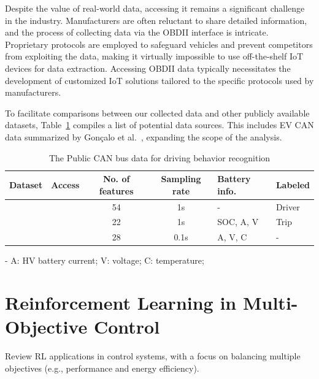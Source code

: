Despite the value of real-world data, accessing it remains a significant challenge in the industry. 
Manufacturers are often reluctant to share detailed information, and the process of collecting data via the \gls{OBDII} interface is intricate. 
Proprietary protocols are employed to safeguard vehicles and prevent competitors from exploiting the data, making it virtually impossible to use off-the-shelf \gls{IoT} devices for data extraction. 
Accessing \gls{OBDII} data typically necessitates the development of customized \gls{IoT} solutions tailored to the specific protocols used by manufacturers.

To facilitate comparisons between our collected data and other publicly available datasets, Table~\ref{tab:public_data} compiles a list of potential data sources. 
This includes \gls{EV} \gls{CAN} data summarized by Gonçalo et al.~\cite{dosreisG2021}, expanding the scope of the analysis.

\begin{table}[!ht]
    \centering
    \caption{The Public \gls{CAN} bus data for driving behavior recognition}
    \begin{tabularx}{\textwidth}{ccccXX}
    \hline
        Dataset & Access & No. of features & Sampling rate& Battery info. & Labeled\\ 
        \hline
        \cite{kwak2016know} & \cite{hcrl} & 54 & 1s & - & Driver \\
        \cite{oh2020vehicle} & \cite{oh_2023_ved} & 22 & 1s & SOC, A, V & Trip \\
        \cite{6jr9-5235-20} & \cite{kagglebattery} & 28 & 0.1s & A, V, C & - \\
        \hline
    \end{tabularx}
    \begin{tablenotes}
      \small
      \item - A: \gls{HV} battery current; V: voltage; C: temperature;
    \end{tablenotes}
    \label{tab:public_data}
\end{table}



\section{Reinforcement Learning in Multi-Objective Control} %

Review RL applications in control systems, with a focus on balancing multiple objectives (e.g., performance and energy efficiency).

